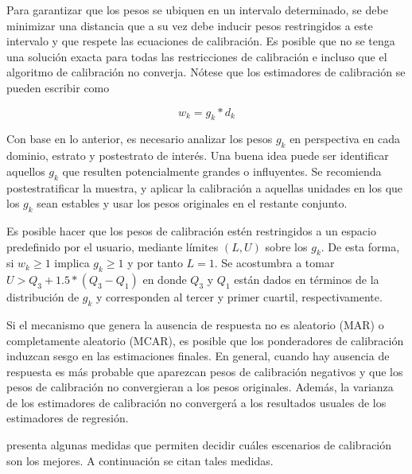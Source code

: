 Para garantizar que los pesos se ubiquen en un intervalo determinado, se debe minimizar una distancia que a su vez debe inducir pesos restringidos a este intervalo y que respete las ecuaciones de calibración. Es posible que no se tenga una solución exacta para todas las restricciones de calibración e incluso que el algoritmo de calibración no converja. Nótese que los estimadores de calibración se pueden escribir como

\[
w_k = g_k * d_k
\]

Con base en lo anterior, es necesario analizar los pesos \(g_k\) en perspectiva en cada dominio, estrato y postestrato de interés. Una buena idea puede ser identificar aquellos \(g_k\) que resulten potencialmente grandes o influyentes. Se recomienda postestratificar la muestra, y aplicar la calibración a aquellas unidades en los que los \(g_k\) sean estables y usar los pesos originales en el restante conjunto.

Es posible hacer que los pesos de calibración estén restringidos a un espacio predefinido por el usuario, mediante límites \((L, U)\) sobre los \(g_k\). De esta forma, si \(w_k \geq 1\) implica \(g_k \geq 1\) y por tanto \(L=1\). Se acostumbra a tomar \(U > Q_3 + 1.5 * (Q_3 - Q_1)\) en donde \(Q_3\) y \(Q_1\) están dados en términos de la distribución de \(g_k\) y corresponden al tercer y primer cuartil, respectivamente.

Si el mecanismo que genera la ausencia de respuesta no es aleatorio (MAR) o completamente aleatorio (MCAR), es posible que los ponderadores de calibración induzcan sesgo en las estimaciones finales. En general, cuando hay ausencia de respuesta es más probable que aparezcan pesos de calibración negativos y que los pesos de calibración no convergieran a los pesos originales. Además, la varianza de los estimadores de calibración no convergerá a los resultados usuales de los estimadores de regresión.

\citet{Silva_2004} presenta algunas medidas que permiten decidir cuáles escenarios de calibración son los mejores. A continuación se citan tales medidas.


